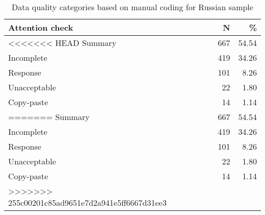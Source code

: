 \begin{table}

\caption{Data quality categories based on manual coding for Russian sample}
\centering
\begin{tabular}[t]{lrr}
\toprule
Attention check & N & \%\\
\midrule
<<<<<<< HEAD
Summary & 667 & 54.54\\
Incomplete & 419 & 34.26\\
Response & 101 & 8.26\\
Unacceptable & 22 & 1.80\\
Copy-paste & 14 & 1.14\\
=======
Summary & 667 & \num{54.54}\\
Incomplete & 419 & \num{34.26}\\
Response & 101 & \num{8.26}\\
Unacceptable & 22 & \num{1.80}\\
Copy-paste & 14 & \num{1.14}\\
>>>>>>> 255c00201c85ad9651e7d2a941e5ff6667d31ee3
\bottomrule
\end{tabular}
\end{table}
